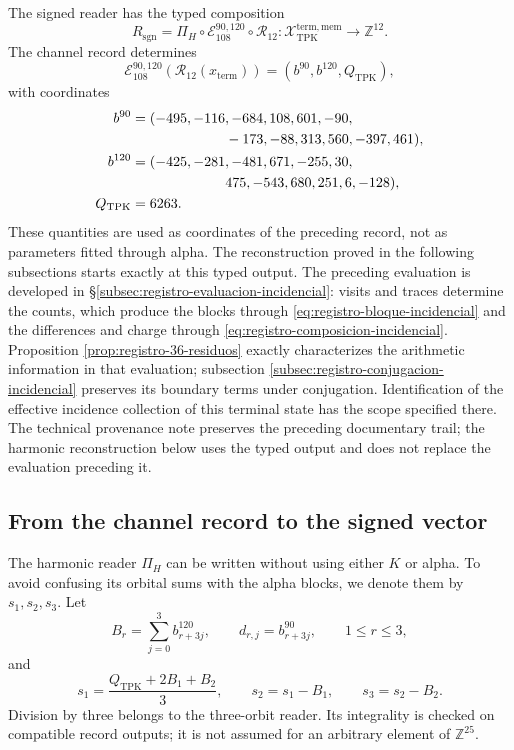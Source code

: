 The signed reader has the typed composition
\begin{equation}
 R_{\mathrm{sgn}}
 =\Pi_H\circ\mathcal E_{108}^{90,120}\circ\mathcal R_{12}:
 \mathcal X_{\mathrm{TPK}}^{\mathrm{term,mem}}
 \longrightarrow\mathbb Z^{12}.
 \label{eq:k-lector-firmado}
\end{equation}
The channel record determines
\[
 \mathcal E_{108}^{90,120}(\mathcal R_{12}(x_{\mathrm{term}}))
 =(b^{90},b^{120},Q_{\mathrm{TPK}}),
\]
with coordinates
\begin{align*}
 b^{90}={}&(-495,-116,-684,108,601,-90,\\
            &\hspace{19mm}-173,-88,313,560,-397,461),\\
 b^{120}={}&(-425,-281,-481,671,-255,30,\\
             &\hspace{19mm}475,-543,680,251,6,-128),\\
 Q_{\mathrm{TPK}}={}&6263.
\end{align*}
These quantities are used as coordinates of the preceding record, not
as parameters fitted through alpha. The reconstruction proved
in the following subsections starts exactly at this typed output.
The preceding evaluation is developed in
\S\ref{subsec:registro-evaluacion-incidencial}: visits and traces
determine the counts, which produce the blocks through
\eqref{eq:registro-bloque-incidencial} and the differences and charge through
\eqref{eq:registro-composicion-incidencial}. Proposition
\ref{prop:registro-36-residuos} exactly characterizes the
arithmetic information in that evaluation; subsection
\ref{subsec:registro-conjugacion-incidencial} preserves its boundary
terms under conjugation. Identification of the effective incidence collection
of this terminal state has the scope specified there.
The technical provenance note preserves the preceding documentary trail;
the harmonic reconstruction below uses the typed output and does not
replace the evaluation preceding it.

\subsection{From the channel record to the signed vector}
\label{subsec:k-pi-h}

The harmonic reader \(\Pi_H\) can be written without using either \(K\) or
alpha. To avoid confusing its orbital sums with the alpha blocks,
we denote them by \(s_1,s_2,s_3\). Let
\[
 B_r=\sum_{j=0}^{3}b^{120}_{r+3j},\qquad
 d_{r,j}=b^{90}_{r+3j},\qquad1\leq r\leq3,
\]
and
\begin{equation}
 s_1=\frac{Q_{\mathrm{TPK}}+2B_1+B_2}{3},\qquad
 s_2=s_1-B_1,\qquad s_3=s_2-B_2.
 \label{eq:k-sumas-armonicas}
\end{equation}
Division by three belongs to the three-orbit reader. Its
integrality is checked on compatible record outputs; it is not
assumed for an arbitrary element of \(\mathbb Z^{25}\).

